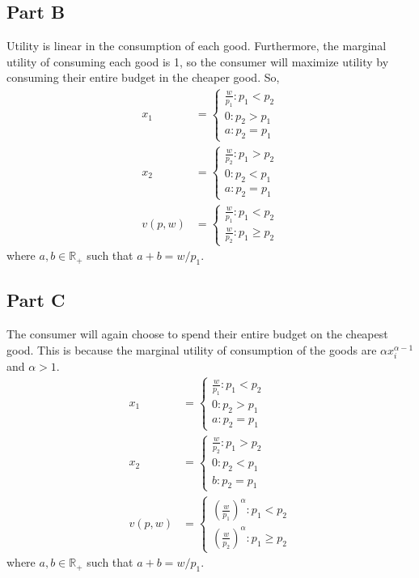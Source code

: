 \documentclass[11pt]{article} %
\begin{document}
\subsection{Part B}
Utility is linear in the consumption of each good. Furthermore, the marginal utility of consuming each good is 1, so the consumer will maximize utility by consuming their entire budget in the cheaper good. So, 
\begin{align*}
x_1 &= \begin{cases} \frac{w}{p_1} : p_1<p_2\\0: p_2>p_1 \\a: p_2=p_1  \end{cases} \\
x_2 &= \begin{cases} \frac{w}{p_2} : p_1>p_2\\0: p_2<p_1 \\ a: p_2=p_1 \end{cases} \\
v(p,w) &=  \begin{cases} \frac{w}{p_1} : p_1<p_2\\ \frac{w}{p_2}: p_1\geq p_2 \end{cases} 
\end{align*}
where $a,b\in \mathbb{R}_+ $ such that $a+b=w/p_1$.
\subsection{Part C}
The consumer will again choose to spend their entire budget on the cheapest good. This is because the marginal utility of consumption of the goods are $\alpha x_i^{\alpha-1}$ and $\alpha>1.$
\begin{align*}
x_1 &= \begin{cases} \frac{w}{p_1} : p_1<p_2\\0: p_2>p_1 \\ a: p_2=p_1 \end{cases} \\
x_2 &= \begin{cases} \frac{w}{p_2} : p_1>p_2\\0: p_2<p_1 \\ b: p_2=p_1 \end{cases} \\
v(p,w) &=  \begin{cases} \left(\frac{w}{p_1}\right)^{\alpha} : p_1<p_2\\ \left(\frac{w}{p_2}\right)^{\alpha}: p_1\geq p_2 \end{cases} 
\end{align*}
where $a,b\in \mathbb{R}_+ $ such that $a+b=w/p_1$.
\end{document}
